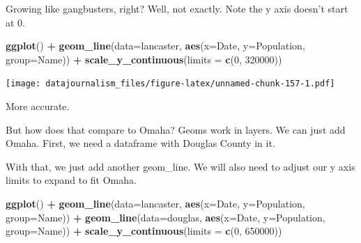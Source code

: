 \documentclass[]{book}
\newenvironment{Shaded}{\begin{snugshade}}{\end{snugshade}}
\newcommand{\DataTypeTok}[1]{\textcolor[rgb]{0.13,0.29,0.53}{#1}}
\newcommand{\DecValTok}[1]{\textcolor[rgb]{0.00,0.00,0.81}{#1}}
\newcommand{\KeywordTok}[1]{\textcolor[rgb]{0.13,0.29,0.53}{\textbf{#1}}}
\newcommand{\NormalTok}[1]{#1}
\newcommand{\OperatorTok}[1]{\textcolor[rgb]{0.81,0.36,0.00}{\textbf{#1}}}
\newcommand{\StringTok}[1]{\textcolor[rgb]{0.31,0.60,0.02}{#1}}
\begin{document}
Growing like gangbusters, right? Well, not exactly. Note the y axis doesn't start at 0.

\begin{Shaded}
\begin{Highlighting}[]
\KeywordTok{ggplot}\NormalTok{() }\OperatorTok{+}\StringTok{ }\KeywordTok{geom_line}\NormalTok{(}\DataTypeTok{data=}\NormalTok{lancaster, }\KeywordTok{aes}\NormalTok{(}\DataTypeTok{x=}\NormalTok{Date, }\DataTypeTok{y=}\NormalTok{Population, }\DataTypeTok{group=}\NormalTok{Name)) }\OperatorTok{+}\StringTok{ }\KeywordTok{scale_y_continuous}\NormalTok{(}\DataTypeTok{limits =} \KeywordTok{c}\NormalTok{(}\DecValTok{0}\NormalTok{, }\DecValTok{320000}\NormalTok{))}
\end{Highlighting}
\end{Shaded}

\texttt{[image: datajournalism\_files/figure-latex/unnamed-chunk-157-1.pdf]}

More accurate.

But how does that compare to Omaha? Geoms work in layers. We can just add Omaha. First, we need a dataframe with Douglas County in it.

\begin{Shaded}
\end{Shaded}

With that, we just add another geom\_line. We will also need to adjust our y axis limits to expand to fit Omaha.

\begin{Shaded}
\begin{Highlighting}[]
\KeywordTok{ggplot}\NormalTok{() }\OperatorTok{+}\StringTok{ }\KeywordTok{geom_line}\NormalTok{(}\DataTypeTok{data=}\NormalTok{lancaster, }\KeywordTok{aes}\NormalTok{(}\DataTypeTok{x=}\NormalTok{Date, }\DataTypeTok{y=}\NormalTok{Population, }\DataTypeTok{group=}\NormalTok{Name)) }\OperatorTok{+}\StringTok{ }\KeywordTok{geom_line}\NormalTok{(}\DataTypeTok{data=}\NormalTok{douglas, }\KeywordTok{aes}\NormalTok{(}\DataTypeTok{x=}\NormalTok{Date, }\DataTypeTok{y=}\NormalTok{Population, }\DataTypeTok{group=}\NormalTok{Name)) }\OperatorTok{+}\StringTok{ }\KeywordTok{scale_y_continuous}\NormalTok{(}\DataTypeTok{limits =} \KeywordTok{c}\NormalTok{(}\DecValTok{0}\NormalTok{, }\DecValTok{650000}\NormalTok{))}
\end{Highlighting}
\end{Shaded}
\end{document}
